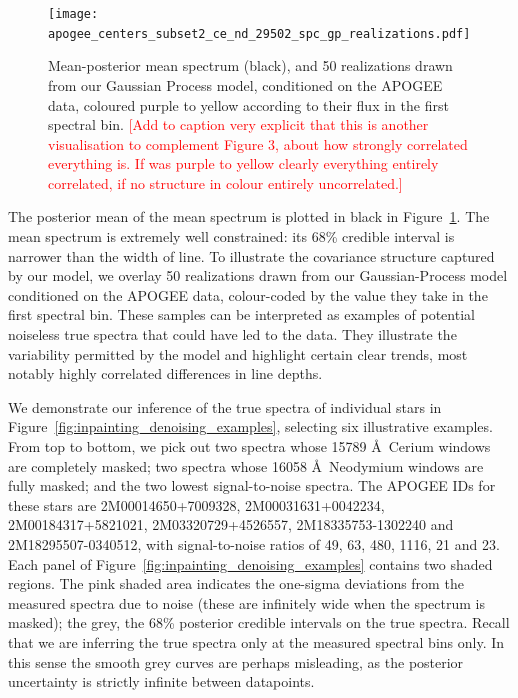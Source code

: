 \documentclass[a4paper,fleqn,usenatbib]{mnras}
\begin{document}
\begin{figure}
	\texttt{[image: apogee\_centers\_subset2\_ce\_nd\_29502\_spc\_gp\_realizations.pdf]}
    \caption{Mean-posterior mean spectrum (black), and 50 realizations drawn from our Gaussian Process model, conditioned on the APOGEE data, coloured purple to yellow according to their flux in the first spectral bin.\textcolor{red}{ [Add to caption very explicit that this is another visualisation to complement Figure 3, about how strongly correlated everything is. If was purple to yellow clearly everything entirely correlated, if no structure in colour entirely uncorrelated.]  }}
    \label{fig:gp_reals}
\end{figure}

The posterior mean of the mean spectrum is plotted in black in Figure~\ref{fig:gp_reals}. The mean spectrum is extremely well constrained: its 68\% credible interval is narrower than the width of line. To illustrate the covariance structure captured by our model, we overlay 50 realizations drawn from our Gaussian-Process model conditioned on the APOGEE data, colour-coded by the value they take in the first spectral bin. These samples can be interpreted as examples of potential noiseless true spectra that could have led to the data. They illustrate the variability permitted by the model and highlight certain clear trends, most notably highly correlated differences in line depths.

We demonstrate our inference of the true spectra of individual stars in Figure~\ref{fig:inpainting_denoising_examples}, selecting six illustrative examples. From top to bottom, we pick out two spectra whose 15789 \AA\ Cerium windows are completely masked; two spectra whose 16058 \AA\ Neodymium windows are fully masked; and the two lowest signal-to-noise spectra. The APOGEE IDs for these stars are 2M00014650+7009328, 2M00031631+0042234, 2M00184317+5821021, 2M03320729+4526557, 2M18335753-1302240 and 2M18295507-0340512, with signal-to-noise ratios of 49, 63, 480, 1116, 21 and 23. Each panel of Figure~\ref{fig:inpainting_denoising_examples} contains two shaded regions. The pink shaded area indicates the one-sigma deviations from the measured spectra due to noise (these are infinitely wide when the spectrum is masked); the grey, the 68\% posterior credible intervals on the true spectra. Recall that we are inferring the true spectra only at the measured spectral bins only. In this sense the smooth grey curves are perhaps misleading, as the posterior uncertainty is strictly infinite between datapoints.
 
\end{document}
